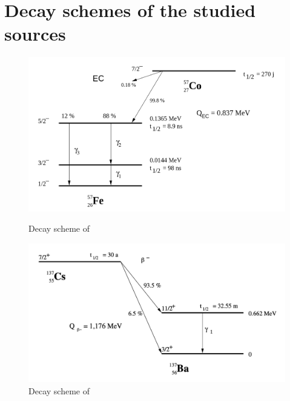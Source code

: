 \section{Decay schemes of the studied sources}
\label{sec:decay_schemes}
%
\begin{figure}[htbp]
    \begin{minipage}[t]{0.5\textwidth}
        \centering
        \captionsetup{width=.95\linewidth}
        \includegraphics[width=\textwidth]{figures/decay_cobalt57.png}
        \caption{Decay scheme of \cobalt \cite{notice_VI}}
        \label{fig:cobalt_decay}
    \end{minipage}
    \begin{minipage}[t]{0.5\textwidth}
        \centering
        \captionsetup{width=.95\linewidth}
        \includegraphics[width=\textwidth]{figures/decay_cesium137.png}
        \caption{Decay scheme of \cesium \cite{notice_VI}}
        \label{fig:cesium_decay}
    \end{minipage}
\end{figure}
%
